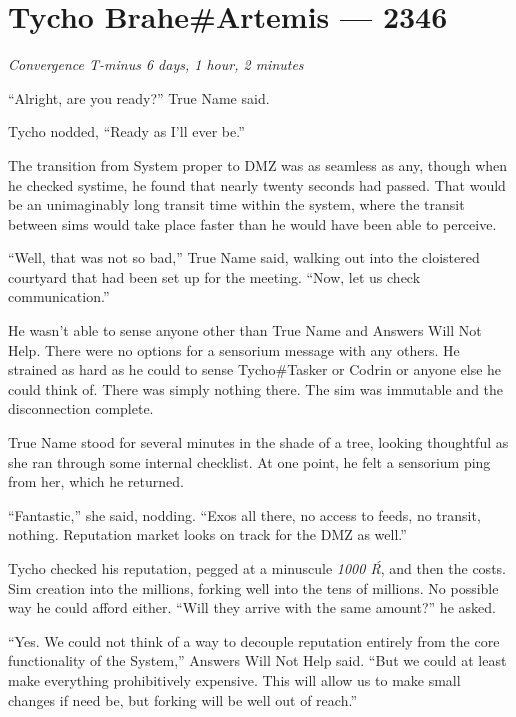 \hypertarget{tycho-braheartemis-2346}{%
\chapter{Tycho Brahe\#Artemis — 2346}}

\begin{center}
\emph{Convergence T-minus 6 days, 1 hour, 2 minutes}
\end{center}

\noindent ``Alright, are you ready?'' True Name said.

Tycho nodded, ``Ready as I'll ever be.''

The transition from System proper to DMZ was as seamless as any, though when he checked systime, he found that nearly twenty seconds had passed. That would be an unimaginably long transit time within the system, where the transit between sims would take place faster than he would have been able to perceive.

``Well, that was not so bad,'' True Name said, walking out into the cloistered courtyard that had been set up for the meeting. ``Now, let us check communication.''

He wasn't able to sense anyone other than True Name and Answers Will Not Help. There were no options for a sensorium message with any others. He strained as hard as he could to sense Tycho\#Tasker or Codrin or anyone else he could think of. There was simply nothing there. The sim was immutable and the disconnection complete.

True Name stood for several minutes in the shade of a tree, looking thoughtful as she ran through some internal checklist. At one point, he felt a sensorium ping from her, which he returned.

``Fantastic,'' she said, nodding. ``Exos all there, no access to feeds, no transit, nothing. Reputation market looks on track for the DMZ as well.''

Tycho checked his reputation, pegged at a minuscule \emph{1000 Ŕ}, and then the costs. Sim creation into the millions, forking well into the tens of millions. No possible way he could afford either. ``Will they arrive with the same amount?'' he asked.

``Yes. We could not think of a way to decouple reputation entirely from the core functionality of the System,'' Answers Will Not Help said. ``But we could at least make everything prohibitively expensive. This will allow us to make small changes if need be, but forking will be well out of reach.''

